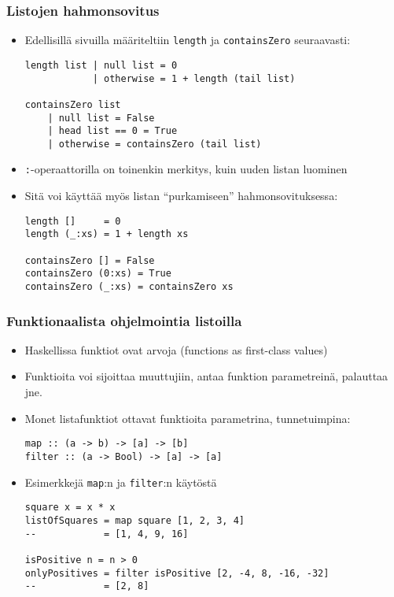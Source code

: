 \documentclass{beamer}
\begin{document}
\begin{frame}[fragile]
\frametitle{Listojen hahmonsovitus}
\begin{itemize}
\item{Edellisillä sivuilla määriteltiin \texttt{length} ja \texttt{containsZero} seuraavasti:}
\begin{verbatim}
length list | null list = 0
            | otherwise = 1 + length (tail list)

containsZero list
    | null list = False
    | head list == 0 = True
    | otherwise = containsZero (tail list)
\end{verbatim}
\item{\texttt{:}-operaattorilla on toinenkin merkitys, kuin uuden listan luominen}
\item{Sitä voi käyttää myös listan ``purkamiseen'' hahmonsovituksessa:}
\begin{verbatim}
length []     = 0
length (_:xs) = 1 + length xs

containsZero [] = False
containsZero (0:xs) = True
containsZero (_:xs) = containsZero xs
\end{verbatim}

\end{itemize}
\end{frame}

\begin{frame}[fragile]
\frametitle{Funktionaalista ohjelmointia listoilla}
\begin{itemize}
\item{Haskellissa funktiot ovat arvoja (functions as first-class values)}
\item{Funktioita voi sijoittaa muuttujiin, antaa funktion parametreinä, palauttaa jne.}
\item{Monet listafunktiot ottavat funktioita parametrina, tunnetuimpina:}
\begin{verbatim}
map :: (a -> b) -> [a] -> [b]
filter :: (a -> Bool) -> [a] -> [a]
\end{verbatim}

\item{Esimerkkejä \texttt{map}:n ja \texttt{filter}:n käytöstä}
\begin{verbatim}
square x = x * x
listOfSquares = map square [1, 2, 3, 4]
--            = [1, 4, 9, 16]

isPositive n = n > 0
onlyPositives = filter isPositive [2, -4, 8, -16, -32]
--            = [2, 8]
\end{verbatim}

\end{itemize}
\end{frame}
\end{document}
